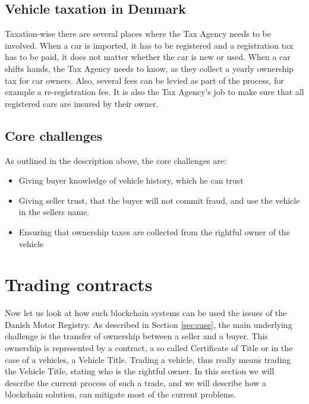 \documentclass[oneside,a4paper,10pts,article]{memoir}
\begin{document}
\section{Vehicle taxation in Denmark}
Taxation-wise there are several places where the Tax Agency needs to
be involved. When a car is imported, it has to be registered and a
registration tax has to be paid, it does not matter whether the car is
new or used. When a car shifts hands, the Tax Agency needs to know, as
they collect a yearly ownership tax for car owners. Also, several fees
can be levied as part of the process, for example a re-registration
fee. It is also the Tax Agency's job to make sure that all registered
cars are insured by their owner.

\section{Core challenges}
As outlined in the description above, the core challenges are:

\begin{itemize}
\item Giving buyer knowledge of vehicle history, which he can trust
\item Giving seller trust, that the buyer will not commit fraud, and
  use the vehicle in the sellers name.
\item Ensuring that ownership taxes are collected from the rightful
  owner of the vehicle
\end{itemize}


\chapter{Trading contracts}
\label{sec:trading}

Now let us look at how such blockchain systems can be used the issues
of the Danish Motor Registry. As described in Section \ref{sec:case},
the main underlying challenge is the transfer of ownership between a
seller and a buyer. This ownership is represented by a contract, a so
called Certificate of Title or in the case of a vehicles, a Vehicle
Title. Trading a vehicle, thus really means trading the Vehicle Title,
stating who is the rightful owner. In this section we will describe
the current process of such a trade, and we will describe how a
blockchain solution, can mitigate most of the current problems.


\end{document}

